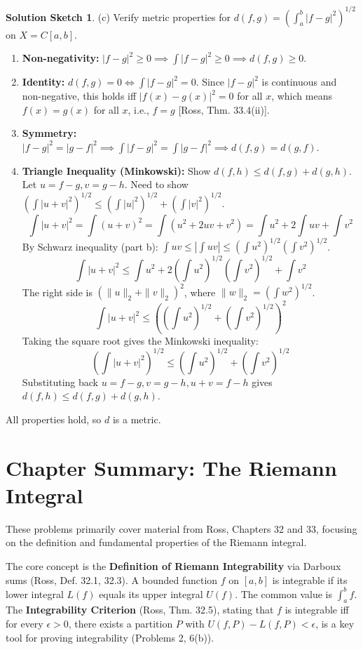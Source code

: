\documentclass{article}
\theoremstyle{definition} %
\theoremstyle{definition} %
\newtheorem*{solution}{Solution Sketch}
\begin{document}
\begin{solution}
(c) Verify metric properties for $d(f,g) = \left(\int_a^b |f-g|^2 \right)^{1/2}$ on $X=C[a,b]$.
\begin{enumerate}
    \item \textbf{Non-negativity:} $|f-g|^2 \ge 0 \implies \int |f-g|^2 \ge 0 \implies d(f,g) \ge 0$.
    \item \textbf{Identity:} $d(f,g)=0 \iff \int |f-g|^2 = 0$. Since $|f-g|^2$ is continuous and non-negative, this holds iff $|f(x)-g(x)|^2 = 0$ for all $x$, which means $f(x)=g(x)$ for all $x$, i.e., $f=g$ [Ross, Thm. 33.4(ii)].
    \item \textbf{Symmetry:} $|f-g|^2 = |g-f|^2 \implies \int |f-g|^2 = \int |g-f|^2 \implies d(f,g)=d(g,f)$.
    \item \textbf{Triangle Inequality (Minkowski):} Show $d(f,h) \le d(f,g) + d(g,h)$. Let $u=f-g, v=g-h$. Need to show $(\int |u+v|^2)^{1/2} \le (\int |u|^2)^{1/2} + (\int |v|^2)^{1/2}$.
    \[ \int |u+v|^2 = \int (u+v)^2 = \int (u^2 + 2uv + v^2) = \int u^2 + 2\int uv + \int v^2 \]
    By Schwarz inequality (part b): $\int uv \le |\int uv| \le (\int u^2)^{1/2} (\int v^2)^{1/2}$.
    \[ \int |u+v|^2 \le \int u^2 + 2(\int u^2)^{1/2}(\int v^2)^{1/2} + \int v^2 \]
    The right side is $(\|u\|_2 + \|v\|_2)^2$, where $\|w\|_2 = (\int w^2)^{1/2}$.
    \[ \int |u+v|^2 \le \left( \left(\int u^2\right)^{1/2} + \left(\int v^2\right)^{1/2} \right)^2 \]
    Taking the square root gives the Minkowski inequality:
    \[ \left(\int |u+v|^2 \right)^{1/2} \le \left(\int u^2\right)^{1/2} + \left(\int v^2\right)^{1/2} \]
    Substituting back $u=f-g, v=g-h, u+v=f-h$ gives $d(f,h) \le d(f,g) + d(g,h)$.
\end{enumerate}
All properties hold, so $d$ is a metric.
\end{solution}

\section*{Chapter Summary: The Riemann Integral}

These problems primarily cover material from Ross, Chapters 32 and 33, focusing on the definition and fundamental properties of the Riemann integral.

The core concept is the \textbf{Definition of Riemann Integrability} via Darboux sums (Ross, Def. 32.1, 32.3). A bounded function $f$ on $[a,b]$ is integrable if its lower integral $L(f)$ equals its upper integral $U(f)$. The common value is $\int_a^b f$. The \textbf{Integrability Criterion} (Ross, Thm. 32.5), stating that $f$ is integrable iff for every $\epsilon > 0$, there exists a partition $P$ with $U(f,P) - L(f,P) < \epsilon$, is a key tool for proving integrability (Problems 2, 6(b)).
\end{document}
